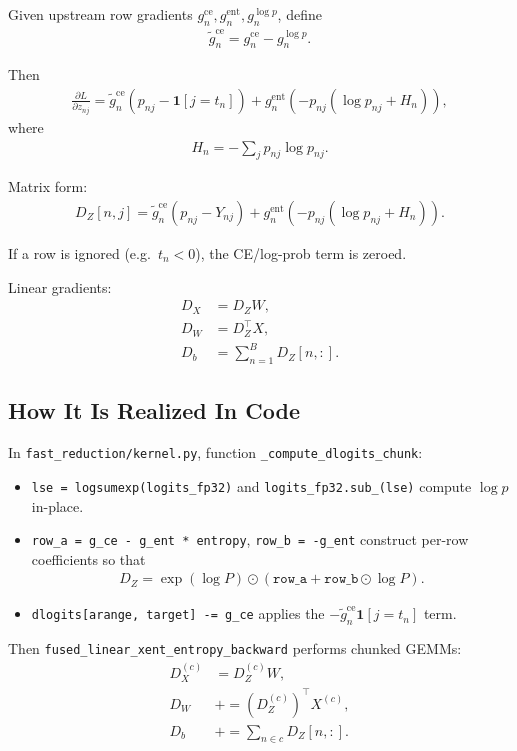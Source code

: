 \documentclass[11pt]{article}
\begin{document}
Given upstream row gradients
$g_n^{\mathrm{ce}}, g_n^{\mathrm{ent}}, g_n^{\log p}$, define
\begin{align}
\tilde g_n^{\mathrm{ce}} = g_n^{\mathrm{ce}} - g_n^{\log p}.
\end{align}

Then
\begin{align}
\frac{\partial L}{\partial z_{nj}}
=
\tilde g_n^{\mathrm{ce}}
\left(p_{nj} - \mathbf{1}[j=t_n]\right)
+ g_n^{\mathrm{ent}}
\left(-p_{nj}\left(\log p_{nj} + H_n\right)\right),
\end{align}
where
\begin{align}
H_n = -\sum_j p_{nj}\log p_{nj}.
\end{align}

Matrix form:
\begin{align}
D_Z[n,j]
=
\tilde g_n^{\mathrm{ce}}\left(p_{nj} - Y_{nj}\right)
+ g_n^{\mathrm{ent}}\left(-p_{nj}(\log p_{nj} + H_n)\right).
\end{align}

If a row is ignored (e.g.\ $t_n < 0$), the CE/log-prob term is zeroed.

Linear gradients:
\begin{align}
D_X &= D_Z W, \\
D_W &= D_Z^\top X, \\
D_b &= \sum_{n=1}^B D_Z[n,:].
\end{align}

\subsection{How It Is Realized In Code}
In \texttt{fast\_reduction/kernel.py}, function
\texttt{\_compute\_dlogits\_chunk}:
\begin{itemize}
\item \texttt{lse = logsumexp(logits\_fp32)} and
\texttt{logits\_fp32.sub\_(lse)} compute $\log p$ in-place.
\item \texttt{row\_a = g\_ce - g\_ent * entropy}, \texttt{row\_b = -g\_ent}
construct per-row coefficients so that
\begin{align}
D_Z = \exp(\log P)\odot(\texttt{row\_a} + \texttt{row\_b}\odot\log P).
\end{align}
\item \texttt{dlogits[arange, target] -= g\_ce} applies the
$-\tilde g_n^{\mathrm{ce}}\mathbf{1}[j=t_n]$ term.
\end{itemize}

Then \texttt{fused\_linear\_xent\_entropy\_backward} performs chunked GEMMs:
\begin{align}
D_X^{(c)} &= D_Z^{(c)} W, \\
D_W &\mathrel{+}= (D_Z^{(c)})^\top X^{(c)}, \\
D_b &\mathrel{+}= \sum_{n\in c} D_Z[n,:].
\end{align}
\end{document}
